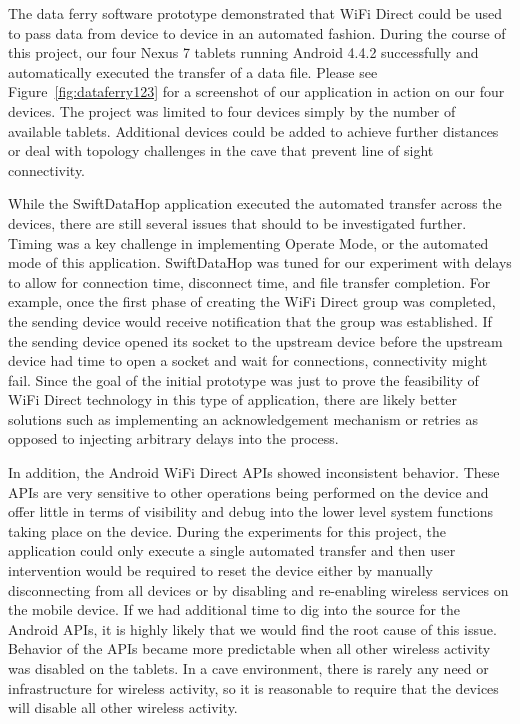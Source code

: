\documentclass[10pt,twocolumn]{article}
\begin{document}
The data ferry software prototype demonstrated that WiFi Direct could be used to pass data from device to device in an automated fashion. 
During the course of this project, our four Nexus 7 tablets running Android 4.4.2 successfully and automatically executed the transfer of a data file.
Please see Figure~\ref{fig:dataferry123} for a screenshot of our application in action on our four devices.
The project was limited to four devices simply by the number of available tablets.
Additional devices could be added to achieve further distances or deal with topology challenges in the cave that prevent line of sight connectivity. 

While the SwiftDataHop application executed the automated transfer across the devices, there are still several issues that should to be investigated further.
Timing was a key challenge in implementing Operate Mode, or the automated mode of this application.
SwiftDataHop was tuned for our experiment with delays to allow for connection time, disconnect time, and file transfer completion.
For example, once the first phase of creating the WiFi Direct group was completed, the sending device would receive notification that the group was established.  
If the sending device opened its socket to the upstream device before the upstream device had time to open a socket and wait for connections, connectivity might fail.
Since the goal of the initial prototype was just to prove the feasibility of WiFi Direct technology in this type of application, there are likely better solutions such as implementing an acknowledgement mechanism or retries as opposed to injecting arbitrary delays into the process. 

In addition, the Android WiFi Direct APIs showed inconsistent behavior.
These APIs are very sensitive to other operations being performed on the device and offer little in terms of visibility and debug into the lower level system functions taking place on the device.
During the experiments for this project, the application could only execute a single automated transfer and then user intervention would be required to reset the device either by manually disconnecting from all devices or by disabling and re-enabling wireless services on the mobile device.
If we had additional time to dig into the source for the Android APIs, it is highly likely that we would find the root cause of this issue.
Behavior of the APIs became more predictable when all other wireless activity was disabled on the tablets.
In a cave environment, there is rarely any need or infrastructure for wireless activity, so it is reasonable to require that the devices will disable all other wireless activity.
\end{document}
